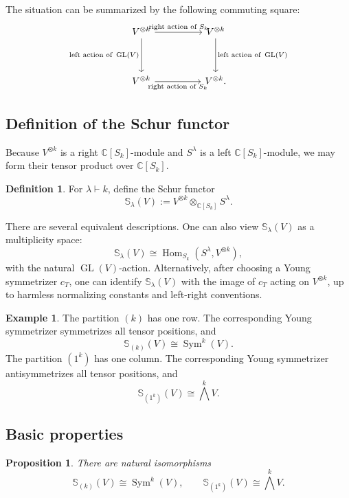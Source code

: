 \documentclass[12pt,a4paper]{article}
\newtheorem{proposition}[theorem]{Proposition}
\theoremstyle{definition}
\newtheorem{definition}[theorem]{Definition}
\newtheorem{example}[theorem]{Example}
\theoremstyle{remark}
\newcommand{\C}{\mathbb{C}}
\newcommand{\GL}{\operatorname{GL}}
\newcommand{\Hom}{\operatorname{Hom}}
\newcommand{\Sym}{\operatorname{Sym}}
\newcommand{\Schur}[1]{\mathbb{S}_{#1}}
\begin{document}
The situation can be summarized by the following commuting square:
\[
\begin{tikzcd}[column sep=huge,row sep=huge]
V^{\otimes k}
  \arrow[r, "{\text{right action of }S_k}"]
  \arrow[d, "{\text{left action of }\GL(V)}"']
&
V^{\otimes k}
  \arrow[d, "{\text{left action of }\GL(V)}"]
\\
V^{\otimes k}
  \arrow[r, "{\text{right action of }S_k}"']
&
V^{\otimes k}.
\end{tikzcd}
\]

\subsection{Definition of the Schur functor}

Because \(V^{\otimes k}\) is a right \(\C[S_k]\)-module and \(S^\lambda\) is
a left \(\C[S_k]\)-module, we may form their tensor product over
\(\C[S_k]\).

\begin{definition}
For \(\lambda\vdash k\), define the Schur functor
\[
\Schur{\lambda}(V)
  :=V^{\otimes k}\otimes_{\C[S_k]}S^\lambda.
\]
\end{definition}

There are several equivalent descriptions.  One can also view
\(\Schur{\lambda}(V)\) as a multiplicity space:
\[
\Schur{\lambda}(V)\cong \Hom_{S_k}(S^\lambda,V^{\otimes k}),
\]
with the natural \(\GL(V)\)-action.  Alternatively, after choosing a Young
symmetrizer \(c_T\), one can identify \(\Schur{\lambda}(V)\) with the image
of \(c_T\) acting on \(V^{\otimes k}\), up to harmless normalizing constants
and left-right conventions.

\begin{example}
The partition \((k)\) has one row.  The corresponding Young symmetrizer
symmetrizes all tensor positions, and
\[
\Schur{(k)}(V)\cong \Sym^k(V).
\]
The partition \((1^k)\) has one column.  The corresponding Young symmetrizer
antisymmetrizes all tensor positions, and
\[
\Schur{(1^k)}(V)\cong \bigwedge^k V.
\]
\end{example}

\subsection{Basic properties}

\begin{proposition}
There are natural isomorphisms
\[
\Schur{(k)}(V)\cong \Sym^k(V),
\qquad
\Schur{(1^k)}(V)\cong \bigwedge^k V.
\]
\end{proposition}
\end{document}
